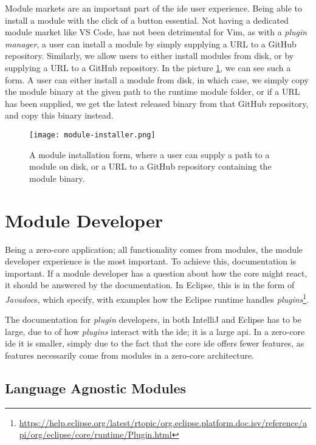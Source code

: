 Module markets are an important part of the \gls*{ide} user experience. Being
able to install a module with the click of a button essential. Not having a
dedicated module market like VS Code, has not been detrimental for
Vim, as with a \textit{plugin manager}, a user can install a module by
simply supplying a URL to a GitHub repository. Similarly, we allow users to
either install modules from disk, or by supplying a URL to a GitHub repository.
In the picture \ref{pic:moduleInstaller}, we can see such a form. A user can
either install a module from disk, in which case, we simply copy the module
binary at the given path to the runtime module folder, or if a URL has been
supplied, we get the latest released binary from that GitHub repository, and
copy this binary instead.

\begin{figure}
  \centering
  \texttt{[image: module-installer.png]}
  \caption{
    A module installation form, where a user can supply a path to a module on
    disk, or a URL to a GitHub repository containing the module binary.
  }
  \label{pic:moduleInstaller}
\end{figure}

\section{Module Developer}

Being a zero-core application; all functionality comes from modules, the module
developer experience is the most important. To achieve this, documentation is
important. If a module developer has a question about how the core might react,
it should be answered by the documentation. In Eclipse, this is in the
form of \textit{Javadoc}s, which specify, with examples how the Eclipse
runtime handles \textit{plugins}\footnote{\url{https://help.eclipse.org/latest/rtopic/org.eclipse.platform.doc.isv/reference/api/org/eclipse/core/runtime/Plugin.html}}.

The documentation for \textit{plugin} developers, in both IntelliJ and
Eclipse has to be large, due to of how \textit{plugins} interact with the
\gls*{ide}; it is a large \gls*{api}. In a zero-core \gls*{ide} it is smaller,
simply due to the fact that the core \gls*{ide} offers fewer features, as features
necessarily come from modules in a zero-core architecture.

\subsection{Language Agnostic Modules}

